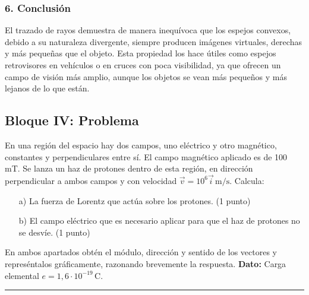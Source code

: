 \subsubsection*{6. Conclusión}
\begin{cajaconclusion}
El trazado de rayos demuestra de manera inequívoca que los espejos convexos, debido a su naturaleza divergente, siempre producen imágenes virtuales, derechas y más pequeñas que el objeto. Esta propiedad los hace útiles como espejos retrovisores en vehículos o en cruces con poca visibilidad, ya que ofrecen un campo de visión más amplio, aunque los objetos se vean más pequeños y más lejanos de lo que están.
\end{cajaconclusion}

\newpage

\subsection{Bloque IV: Problema}
\label{subsec:B4_2011_jun_ord}

\begin{cajaenunciado}
En una región del espacio hay dos campos, uno eléctrico y otro magnético, constantes y perpendiculares entre sí. El campo magnético aplicado es de 100 mT. Se lanza un haz de protones dentro de esta región, en dirección perpendicular a ambos campos y con velocidad $\vec{v}=10^{6}\vec{i}\,\text{m/s}$. Calcula:
\begin{enumerate}
    \item[a)] La fuerza de Lorentz que actúa sobre los protones. (1 punto)
    \item[b)] El campo eléctrico que es necesario aplicar para que el haz de protones no se desvíe. (1 punto)
\end{enumerate}
En ambos apartados obtén el módulo, dirección y sentido de los vectores y represéntalos gráficamente, razonando brevemente la respuesta.
\textbf{Dato:} Carga elemental $e=1,6\cdot10^{-19}\,\text{C}$.
\end{cajaenunciado}
\hrule


